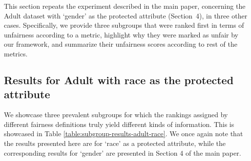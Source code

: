 \documentclass{article}
\begin{document}
This section repeats the experiment described in the main paper, concerning the Adult dataset with `gender' as the protected attribute (Section~4), in three other cases. 
Specifically, we provide three subgroups that were ranked first in terms of unfairness according to a metric, highlight why they were marked as unfair by our framework, and summarize their unfairness scores according to rest of the metrics.


\subsection{Results for Adult with race as the protected attribute}

We showcase
three prevalent subgroups for which the rankings assigned by different fairness definitions truly yield different kinds of information. This is showcased in Table \ref{table:subgroup-results-adult-race}.
We once again note that the results presented here are for `race' as a protected attribute, while the corresponding results  for `gender' are presented in Section 4 of the main paper.
\end{document}
